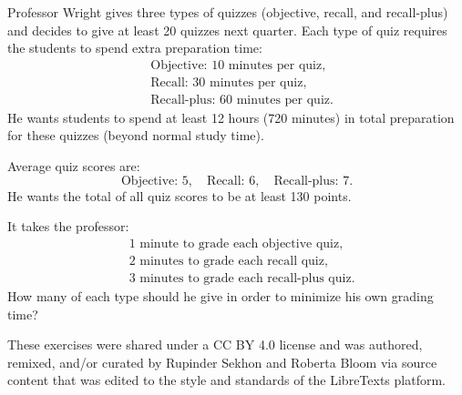 \begin{ex}{}{}
Professor Wright gives three types of quizzes (objective, recall, and recall-plus) and decides to give at least 20 quizzes next quarter. Each type of quiz requires the students to spend extra preparation time:
\[
\begin{aligned}
&\text{Objective: } 10 \text{ minutes per quiz},\\
&\text{Recall: } 30 \text{ minutes per quiz},\\
&\text{Recall-plus: } 60 \text{ minutes per quiz}.
\end{aligned}
\]
He wants students to spend at least 12 hours (720 minutes) in total preparation for these quizzes (beyond normal study time).

Average quiz scores are:
\[
\text{Objective: } 5,\quad
\text{Recall: } 6,\quad
\text{Recall-plus: } 7.
\]
He wants the total of all quiz scores to be at least 130 points.

It takes the professor:
\[
\begin{aligned}
& 1 \text{ minute to grade each objective quiz},\\
& 2 \text{ minutes to grade each recall quiz},\\
& 3 \text{ minutes to grade each recall-plus quiz}.
\end{aligned}
\]
How many of each type should he give in order to minimize his own grading time?
\end{ex}

These exercises were shared under a CC BY 4.0 license and was authored, remixed, and/or curated by Rupinder Sekhon and Roberta Bloom via source content that was edited to the style and standards of the LibreTexts platform.



